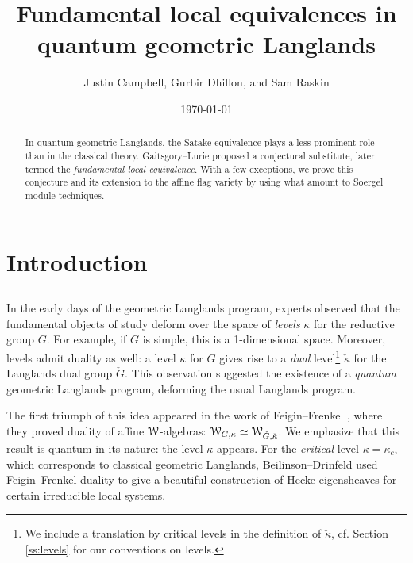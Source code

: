 \documentclass[11pt,reqno]{amsart}
\theoremstyle{remark}
\numberwithin{equation}{section}
\newcommand{\sW}{\EuScript{W}}
\begin{document}
\frenchspacing

\title{Fundamental local equivalences in quantum geometric Langlands}

\author{Justin Campbell, Gurbir Dhillon, and Sam Raskin}


\date{\today}

\begin{abstract}

In quantum geometric Langlands, the Satake equivalence plays
a less prominent role than in the classical theory.
Gaitsgory--Lurie proposed a conjectural substitute, later 
termed the \emph{fundamental local equivalence}. 
With a few exceptions, we prove this 
conjecture and its extension to the affine flag variety by using what amount to 
Soergel module techniques.

\end{abstract}

\maketitle

\setcounter{tocdepth}{1}
\tableofcontents

\section{Introduction}

\subsection{}

In the early days of the geometric Langlands program, experts 
observed that the fundamental objects of study deform over the
space of \emph{levels} $\kappa$ for the reductive group $G$. For example,
if $G$ is simple, this is a 1-dimensional space. 
Moreover, levels admit duality as well: a level $\kappa$ for $G$ gives rise
to a \emph{dual} level\footnote{We include a translation by critical levels
in the definition of $\check{\kappa}$, cf. Section \ref{ss:levels} for our 
conventions on levels.} 
$\check{\kappa}$ for the Langlands dual group $\check{G}$.
This observation suggested the existence of a \emph{quantum} geometric Langlands program,
deforming the usual Langlands program.

The first triumph of this idea appeared in the work of Feigin--Frenkel 
\cite{ff-duality}, where they proved duality of affine $\sW$-algebras:
$\sW_{G,\kappa} \simeq \sW_{\check{G},\check{\kappa}}$. We emphasize that
this result is quantum in its nature: the level $\kappa$ appears.
For the \emph{critical} level $\kappa = \kappa_c$, 
which corresponds to classical geometric Langlands, 
Beilinson--Drinfeld \cite{bdh} used Feigin--Frenkel duality to give
a beautiful construction of Hecke eigensheaves for certain irreducible local 
systems. 
\end{document}
